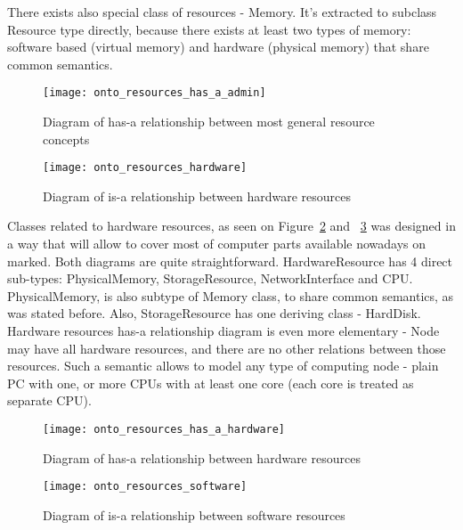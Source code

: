There exists also special class of resources - Memory. It's extracted to subclass Resource type directly, because there
exists at least two types of memory: software based (virtual memory) and hardware (physical memory) that share
common semantics.

\begin{figure}[ht]
  \centering
  \texttt{[image: onto\_resources\_has\_a\_admin]}
  \caption{Diagram of has-a relationship between most general resource concepts}
  \label{fig:onto_resources_has_a_admin}
\end{figure}

\pagebreak


\begin{figure}[ht]
  \centering
  \texttt{[image: onto\_resources\_hardware]}
  \caption{Diagram of is-a relationship between hardware resources}
  \label{fig:onto_resources_hardware}
\end{figure}

Classes related to hardware resources, as seen on Figure~\ref{fig:onto_resources_hardware}
and ~\ref{fig:onto_resources_has_a_hardware} was designed in a way that will allow to cover most of computer parts
available nowadays on marked. Both diagrams are quite straightforward. HardwareResource has 4 direct sub-types:
PhysicalMemory, StorageResource, NetworkInterface and CPU. PhysicalMemory, is also subtype of Memory class, to share
common semantics, as was stated before. Also, StorageResource has one deriving class - HardDisk. 
Hardware resources has-a relationship diagram is even more elementary - Node may have all hardware resources, and there
are no other relations between those resources. Such a semantic allows to model any type of computing node - plain PC
with one, or more CPUs with at least one core (each core is treated as separate CPU).

\begin{figure}[ht]
  \centering
  \texttt{[image: onto\_resources\_has\_a\_hardware]}
  \caption{Diagram of has-a relationship between hardware resources}
  \label{fig:onto_resources_has_a_hardware}
\end{figure}


\begin{figure}[ht]
  \centering
  \texttt{[image: onto\_resources\_software]}
  \caption{Diagram of is-a relationship between software resources}
  \label{fig:onto_resources_software}
\end{figure}

